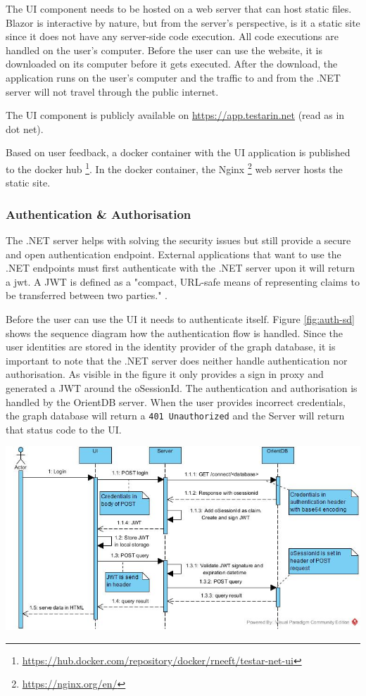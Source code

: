The UI component needs to be hosted on a web server that can host static files. Blazor is interactive by nature, but from the server's perspective, is it a static site since it does not have any server-side code execution. All code executions are handled on the user's computer. Before the user can use the website, it is downloaded on its computer before it gets executed. After the download, the application runs on the user's computer and the traffic to and from the .NET server will not travel through the public internet. 

The UI component is publicly available on \url{https://app.testarin.net} (read as \testar in dot net). 

Based on user feedback, a docker container with the UI application is published to the docker hub \footnote{\url{https://hub.docker.com/repository/docker/rneeft/testar-net-ui}}. In the docker container, the Nginx \footnote{\url{https://nginx.org/en/}} web server hosts the static site.

\subsubsection{Authentication \& Authorisation}
The .NET server helps with solving the security issues but still provide a secure and open authentication endpoint. External applications that want to use the .NET endpoints must first authenticate with the .NET server upon it will return a \acrfull{jwt}. A JWT is defined as a "compact, URL-safe means of representing claims to be transferred between two parties." \cite{jones2015json}.

Before the user can use the UI it needs to authenticate itself. Figure \ref{fig:auth-sd} shows the sequence diagram how the authentication flow is handled. Since the user identities are stored in the identity provider of the graph database, it is important to note that the .NET server does neither handle authentication nor authorisation. As visible in the figure it only provides a sign in proxy and generated a JWT around the oSessionId. The authentication and authorisation is handled by the OrientDB server. When the user provides incorrect credentials, the graph database will return a \verb|401 Unauthorized| and the Server will return that status code to the UI.

\begingroup
\captionsetup{type=figure}
\includegraphics[scale=0.6]{thesis/images/authentication.jpg}
\label{fig:auth-sd}
\endgroup

